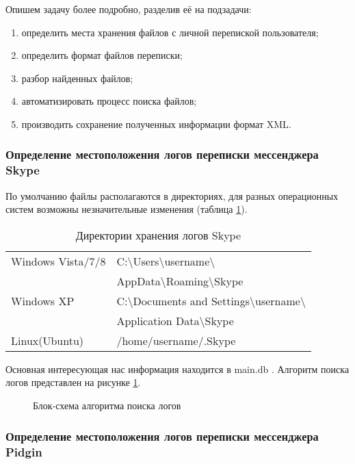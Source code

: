 Опишем задачу более подробно, разделив её на подзадачи:
\begin{enumerate}
\item определить места хранения файлов с личной перепиской пользователя;
\item определить формат файлов переписки;
\item разбор найденных файлов;
\item автоматизировать процесс поиска файлов;
\item производить сохранение полученных информации формат XML.
\end{enumerate}

\subsubsection{Определение местоположения логов переписки мессенджера Skype}

По умолчанию файлы располагаются в директориях, для разных операционных систем возможны незначительные изменения (таблица \ref{tab:skype}). 

\begin{table}[h!]
\caption{Директории хранения логов Skype}
\label{tab:skype}
\begin{tabularx}{\linewidth}{|l|X|}
\hline
Windows Vista/7/8 & C:\textbackslash  Users\textbackslash  username\textbackslash\\ &  AppData\textbackslash  Roaming\textbackslash  Skype\\
\hline
Windows XP & C:\textbackslash  Documents and Settings\textbackslash  username\textbackslash\\ &  Application Data\textbackslash  Skype\\
\hline
Linux(Ubuntu) & /home/username/.Skype\\
\hline
\end{tabularx}
\end{table}

Основная интересующая нас информация находится в main.db \cite{skypechat}. Алгоритм поиска логов представлен на рисунке \ref{pic:list_of_logs}.

\begin{figure}[h]
\caption{Блок-схема алгоритма поиска логов}
\label{pic:list_of_logs}
\end{figure}

\subsubsection{Определение местоположения логов переписки мессенджера Pidgin}

